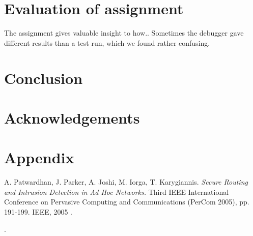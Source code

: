 \documentclass[a4paper,11pt]{article}
\begin{document}
\section{Evaluation of assignment}
The assignment gives valuable insight to how..
Sometimes the debugger gave different results than a test run, which we found rather confusing. 

\section{Conclusion}

\section{Acknowledgements}

\section{Appendix}


\footnotesize{  %
\begin{thebibliography}{N}

 A. Patwardhan, J. Parker, A. Joshi, M. Iorga, T. Karygiannis.
\textit{Secure Routing and Intrusion Detection in Ad Hoc Networks.}
Third IEEE International Conference on Pervasive Computing and Communications (PerCom 2005), pp. 191-199. IEEE, 2005 .


\end{thebibliography}.  
}
\end{document}
